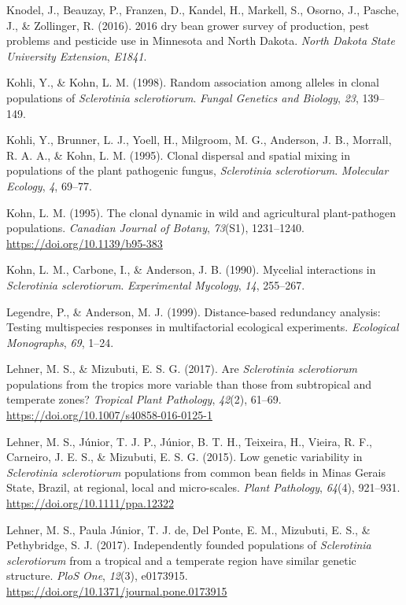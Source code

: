 \hypertarget{ref-knodel2016dry}{}
Knodel, J., Beauzay, P., Franzen, D., Kandel, H., Markell, S., Osorno,
J., Pasche, J., \& Zollinger, R. (2016). 2016 dry bean grower survey of
production, pest problems and pesticide use in Minnesota and North
Dakota. \emph{North Dakota State University Extension}, \emph{E1841}.

\hypertarget{ref-kohli1998random}{}
Kohli, Y., \& Kohn, L. M. (1998). Random association among alleles in
clonal populations of \emph{Sclerotinia sclerotiorum}. \emph{Fungal
Genetics and Biology}, \emph{23}, 139--149.

\hypertarget{ref-kohli1995clonal}{}
Kohli, Y., Brunner, L. J., Yoell, H., Milgroom, M. G., Anderson, J. B.,
Morrall, R. A. A., \& Kohn, L. M. (1995). Clonal dispersal and spatial
mixing in populations of the plant pathogenic fungus, \emph{Sclerotinia
sclerotiorum}. \emph{Molecular Ecology}, \emph{4}, 69--77.

\hypertarget{ref-kohn1995clonal}{}
Kohn, L. M. (1995). The clonal dynamic in wild and agricultural
plant-pathogen populations. \emph{Canadian Journal of Botany},
\emph{73}(S1), 1231--1240. \url{https://doi.org/10.1139/b95-383}

\hypertarget{ref-kohn1990mycelial}{}
Kohn, L. M., Carbone, I., \& Anderson, J. B. (1990). Mycelial
interactions in \emph{Sclerotinia sclerotiorum}. \emph{Experimental
Mycology}, \emph{14}, 255--267.

\hypertarget{ref-legendre1999distance}{}
Legendre, P., \& Anderson, M. J. (1999). Distance-based redundancy
analysis: Testing multispecies responses in multifactorial ecological
experiments. \emph{Ecological Monographs}, \emph{69}, 1--24.

\hypertarget{ref-lehner2017sclerotinia}{}
Lehner, M. S., \& Mizubuti, E. S. G. (2017). Are \emph{Sclerotinia
sclerotiorum} populations from the tropics more variable than those from
subtropical and temperate zones? \emph{Tropical Plant Pathology},
\emph{42}(2), 61--69. \url{https://doi.org/10.1007/s40858-016-0125-1}

\hypertarget{ref-lehner2015genetic}{}
Lehner, M. S., Júnior, T. J. P., Júnior, B. T. H., Teixeira, H., Vieira,
R. F., Carneiro, J. E. S., \& Mizubuti, E. S. G. (2015). Low genetic
variability in \emph{Sclerotinia sclerotiorum} populations from common
bean fields in Minas Gerais State, Brazil, at regional, local and
micro-scales. \emph{Plant Pathology}, \emph{64}(4), 921--931.
\url{https://doi.org/10.1111/ppa.12322}

\hypertarget{ref-lehner2017independently}{}
Lehner, M. S., Paula Júnior, T. J. de, Del Ponte, E. M., Mizubuti, E.
S., \& Pethybridge, S. J. (2017). Independently founded populations of
\emph{Sclerotinia sclerotiorum} from a tropical and a temperate region
have similar genetic structure. \emph{PloS One}, \emph{12}(3), e0173915.
\url{https://doi.org/10.1371/journal.pone.0173915}

